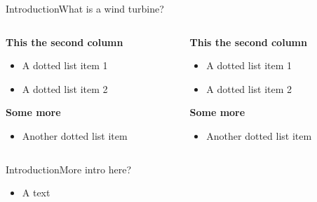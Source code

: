 \begin{frame}{Introduction}{What is a wind turbine?}
 		\begin{columns}
 		\begin{column}{.5\textwidth}
			\textbf{This the second column}
			\begin{itemize}
				\item A dotted list item 1
				\item A dotted list item 2
				
			\end{itemize} \bigskip
			\textbf{Some more} 
			\begin{itemize}
				\item Another dotted list item		
			\end{itemize}
		\end{column}
 	
 		\begin{column}{.5\textwidth}
 			\textbf{This the second column}
 			\begin{itemize}
 				\item A dotted list item 1
 				\item A dotted list item 2

 			\end{itemize} \bigskip
 			\textbf{Some more} 
 			\begin{itemize}
 				\item Another dotted list item		
 			\end{itemize}
		\end{column}
 	\end{columns}	
\end{frame}


\begin{frame}{Introduction}{More intro here?}
	\begin{itemize}
		\item A text
	\end{itemize}\bigskip
\end{frame}


%
